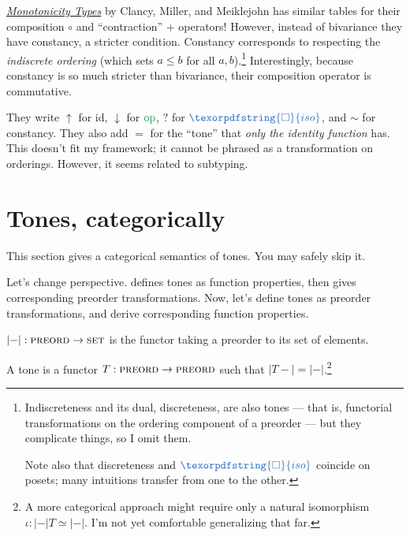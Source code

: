 \documentclass[ribbons]{rntz}
\newcommand{\cat}[1]{\textsc{#1}} %
\newcommand{\Pre}{\cat{preord}}
\newcommand{\Set}{\cat{set}}
\newcommand{\isoto}{\simeq}
\newcommand{\id}{\ensuremath{\textrm{id}}}
\newcommand{\op}{\ensuremath{\textrm{op}}}
\newcommand{\iso}{\ensuremath{\textrm{iso}}}     %
\renewcommand{\iso}{\texorpdfstring{\ensuremath{\Box}}{iso}}
\newcommand{\tm}{\id}                        %
\newcommand{\ta}{{\color{ForestGreen}\op}}   %
\newcommand{\ti}{{\color{NavyBlue}\iso}}     %
\begin{document}
\href{https://infoscience.epfl.ch/record/231867/files/monotonicity-types.pdf}{\emph{Monotonicity
    Types}} by Clancy, Miller, and Meiklejohn has similar tables for their
composition $\circ$ and ``contraction'' $+$ operators! However, instead of
bivariance they have constancy, a stricter condition.
%
Constancy corresponds to respecting the \emph{indiscrete ordering} (which sets
$a \le b$ for all $a,b$).\footnote{Indiscreteness and its dual, discreteness,
  are also tones --- that is, functorial transformations on the ordering
  component of a preorder --- but they complicate things, so I omit them.

  Note also that discreteness and $\ti$ coincide on posets; many intuitions
  transfer from one to the other.}
%
Interestingly, because constancy is so much stricter than bivariance, their
composition operator is commutative.

They write $\uparrow$ for $\tm$, $\downarrow$ for $\ta$, $?$ for $\ti$, and
$\sim$ for constancy. They also add $=$ for the ``tone'' that \emph{only the
  identity function} has. This doesn't fit my framework; it cannot be phrased as
a transformation on orderings. However, it seems related to subtyping.



\section{Tones, categorically}

\newcommand{\elems}[1]{\ensuremath{|{#1}|}}
\newcommand{\elemsfn}[0]{\elems{-}}


This section gives a categorical semantics of tones. You may safely skip it.

Let's change perspective.  defines tones as function
pro\-per\-ties, then gives corresponding pre\-order trans\-form\-ations. Now,
let's define tones as preorder transformations, and derive corresponding
function properties.

\begin{definition}
  $\elemsfn : \Pre \to \Set$ is the functor taking a preorder to its set of
  elements.
\end{definition}

\begin{definition}[Tones]\label{def:tone}
  A tone is a functor $T : \Pre \to \Pre$ such that $\elems{T-} =
  \elemsfn$.\footnote{A more categorical approach might require only a natural
    isomorphism \(\iota : \elemsfn T \isoto \elemsfn\). I'm not
    yet comfortable generalizing that far. }
\end{definition}
\end{document}
